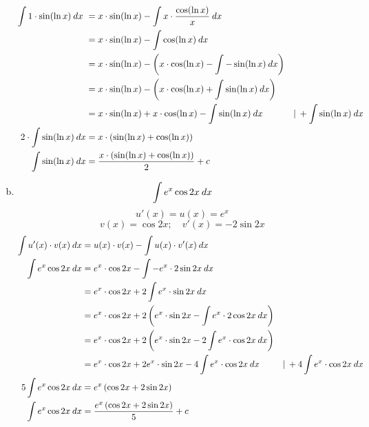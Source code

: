 \documentclass[
    10pt,
    parskip=half-,
    paper=a4,
    english,ngerman,
    fleqn,
]{scrartcl}
\begin{document}
\begin{enumerate}[a)]
\begin{align*}
        \int 1 \cdot \sin (\ln x) \> dx\
        &= x\cdot\sin(\ln x) -\int x\cdot \dfrac{\cos(\ln x)}{x} \> dx\\
        &= x\cdot\sin(\ln x) -\int \cos(\ln x) \> dx\\
        &= x\cdot\sin(\ln x) -\left(x\cdot\cos(\ln x)-\int-\sin(\ln x)\> dx\right)\\
        &= x\cdot\sin(\ln x) -\left(x\cdot\cos(\ln x)+\int\sin(\ln x)\> dx\right)\\
        &= x\cdot\sin(\ln x) + x\cdot\cos(\ln x)-\int\sin(\ln x)\> dx
            &|\>+\int\sin(\ln x)\> dx\\
        2\cdot\int\sin(\ln x)\> dx &= x\cdot\left(\sin(\ln x)+\cos(\ln x)\right)\\
        \int\sin(\ln x)\> dx
            &= \dfrac{x\cdot\left(\sin(\ln x)+\cos(\ln x)\right)}{2} + c
    \end{align*}
\item \[ \int e^x \cos 2x \> dx \]
    \[ u'(x) = u(x) = e^x \]
    \[ v(x) = \cos 2x; \quad v'(x) = -2\sin 2x \]
    \begin{align*}
        \int u'(x) \cdot v(x) \> dx &=
            u(x)\cdot v(x) - \int u(x) \cdot v'(x) \> dx\\
        \int e^x \cos 2x \> dx
        &= e^x \cdot\cos 2x - \int -e^x \cdot 2\sin 2x \> dx\\
        &= e^x \cdot\cos 2x + 2\int e^x \cdot \sin 2x \> dx\\
        &= e^x \cdot\cos 2x + 2\left(e^x \cdot \sin 2x -
            \int e^x\cdot 2 \cos 2x \> dx \right)\\
        &= e^x \cdot\cos 2x + 2\left(e^x \cdot \sin 2x -
            2 \int e^x\cdot \cos 2x \> dx \right)\\
        &= e^x \cdot\cos 2x + 2 e^x \cdot \sin 2x -
            4 \int e^x\cdot \cos 2x \> dx &|\>+4\int e^x\cdot\cos 2x \> dx\\
        5 \int e^x \cos 2x \> dx &= e^x \left(\cos 2x + 2 \sin 2x \right)\\
        \int e^x \cos 2x \> dx &= \dfrac{e^x \left(\cos 2x + 2\sin 2x \right)}{5} +
        c
    \end{align*}
\end{enumerate}
\end{document}
